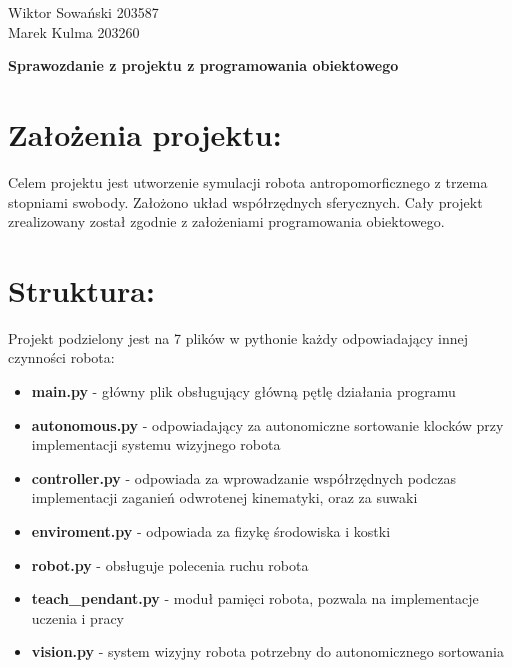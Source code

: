 \documentclass[12pt, a4paper]{article}
\begin{document}
\begin{flushright}
    Wiktor Sowański 203587 \\
    Marek Kulma 203260
\end{flushright}

\vspace{1cm}

\begin{center}
    \Large\textbf{Sprawozdanie z projektu z programowania obiektowego} \\
\end{center}

\vspace{0.5cm}

\section{Założenia projektu:}
Celem projektu jest utworzenie symulacji robota antropomorficznego z trzema stopniami swobody. Założono układ współrzędnych sferycznych.
Cały projekt zrealizowany został zgodnie z założeniami programowania obiektowego.

\section{Struktura:}
Projekt podzielony jest na 7 plików w pythonie każdy odpowiadający innej czynności robota:
\begin{itemize}[noitemsep, topsep=0pt]
    \item \textbf{main.py} - główny plik obsługujący główną pętlę działania programu
    \item \textbf{autonomous.py} - odpowiadający za autonomiczne sortowanie klocków przy implementacji systemu wizyjnego robota
    \item \textbf{controller.py} - odpowiada za wprowadzanie współrzędnych podczas implementacji zaganień odwrotenej kinematyki, oraz za suwaki
    \item \textbf{enviroment.py} - odpowiada za fizykę środowiska i kostki
    \item \textbf{robot.py} - obsługuje polecenia ruchu robota
    \item \textbf{teach\_pendant.py} - moduł pamięci robota, pozwala na implementacje uczenia i pracy
    \item \textbf{vision.py} - system wizyjny robota potrzebny do autonomicznego sortowania
\end{itemize}


\end{document}

